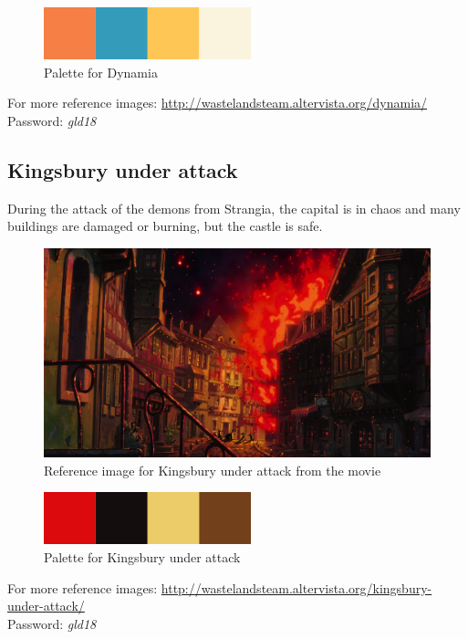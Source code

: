 \begin{figure}[H]
  \centering
  \includegraphics[width=6cm]{Images/Palettes/dynamia}
  \caption{Palette for Dynamia}
\end{figure}

For more reference images: \url{http://wastelandsteam.altervista.org/dynamia/} \\
Password: \textit{gld18}

\pagebreak

\subsection{Kingsbury under attack}
During the attack of the demons from Strangia, the capital is in chaos and many buildings are damaged or burning, but the castle is safe.
\begin{figure}[H]
  \centering
  \includegraphics[width=12cm]{../Images/Locations/kingsburyUnderAttack}
  \caption{Reference image for Kingsbury under attack from the movie}
\end{figure}

\begin{figure}[H]
  \centering
  \includegraphics[width=6cm]{Images/Palettes/kingsburyUnderAttack}
  \caption{Palette for Kingsbury under attack}
\end{figure}

For more reference images: \url{http://wastelandsteam.altervista.org/kingsbury-under-attack/} \\
Password: \textit{gld18}


